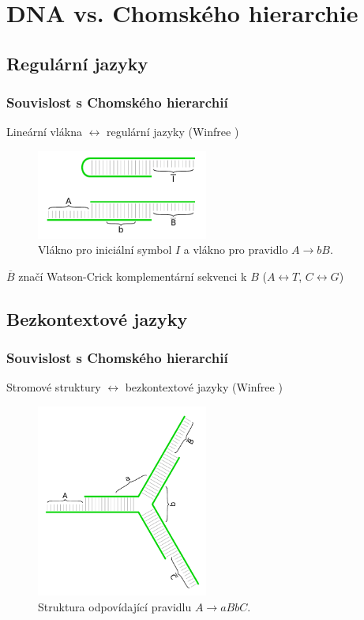 \documentclass[10pt]{beamer}
\theoremstyle{definition}
\theoremstyle{remark}
\begin{document}
\section{DNA vs. Chomského hierarchie}
\subsection{Regulární jazyky}
\begin{frame}
\frametitle{Souvislost s Chomského hierarchií}
	Lineární vlákna $\leftrightarrow$ regulární jazyky (Winfree \cite{winfree_phd})
	\begin{figure}[h]
	\begin{center}
		\includegraphics[width=0.502\textwidth]{../figures/strand_types/linear.pdf} %
		\caption{Vlákno pro iniciální symbol $I$ a vlákno pro pravidlo $A\rightarrow bB$.}
	\end{center}
	\end{figure}
	$\overline{B}$ značí Watson-Crick komplementární sekvenci k $B$ ($A \leftrightarrow T$, $C \leftrightarrow G$)
\end{frame}

\subsection{Bezkontextové jazyky}
\begin{frame}
\frametitle{Souvislost s Chomského hierarchií}
	Stromové struktury $\leftrightarrow$ bezkontextové jazyky (Winfree \cite{winfree_phd})
	\begin{figure}[h]
	\begin{center}
		\includegraphics[width=0.502\textwidth]{../figures/strand_types/dendrimer.pdf} %
		\caption{Struktura odpovídající pravidlu $A\rightarrow aBbC$.}
	\end{center}
	\end{figure}
\end{frame}
\end{document}
